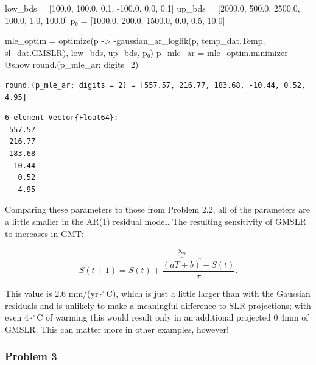 \documentclass[
  letterpaper,
  DIV=11,
  numbers=noendperiod]{scrartcl}
\newenvironment{Shaded}{\begin{snugshade}}{\end{snugshade}}
\newcommand{\FloatTok}[1]{\textcolor[rgb]{0.68,0.00,0.00}{#1}}
\newcommand{\FunctionTok}[1]{\textcolor[rgb]{0.28,0.35,0.67}{#1}}
\newcommand{\NormalTok}[1]{\textcolor[rgb]{0.00,0.23,0.31}{#1}}
\newcommand{\OperatorTok}[1]{\textcolor[rgb]{0.37,0.37,0.37}{#1}}
\newcommand{\PreprocessorTok}[1]{\textcolor[rgb]{0.68,0.00,0.00}{#1}}
\begin{document}
\begin{Shaded}
\begin{Highlighting}[]
\NormalTok{low\_bds }\OperatorTok{=}\NormalTok{ [}\FloatTok{100.0}\NormalTok{, }\FloatTok{100.0}\NormalTok{, }\FloatTok{0.1}\NormalTok{, }\OperatorTok{{-}}\FloatTok{100.0}\NormalTok{, }\FloatTok{0.0}\NormalTok{, }\FloatTok{0.1}\NormalTok{]}
\NormalTok{up\_bds }\OperatorTok{=}\NormalTok{ [}\FloatTok{2000.0}\NormalTok{, }\FloatTok{500.0}\NormalTok{, }\FloatTok{2500.0}\NormalTok{, }\FloatTok{100.0}\NormalTok{, }\FloatTok{1.0}\NormalTok{, }\FloatTok{100.0}\NormalTok{]}
\NormalTok{p₀ }\OperatorTok{=}\NormalTok{ [}\FloatTok{1000.0}\NormalTok{, }\FloatTok{200.0}\NormalTok{, }\FloatTok{1500.0}\NormalTok{, }\FloatTok{0.0}\NormalTok{, }\FloatTok{0.5}\NormalTok{, }\FloatTok{10.0}\NormalTok{]}

\NormalTok{mle\_optim }\OperatorTok{=} \FunctionTok{optimize}\NormalTok{(p }\OperatorTok{{-}\textgreater{}} \FunctionTok{{-}gaussian\_ar\_loglik}\NormalTok{(p, temp\_dat.Temp, sl\_dat.GMSLR), low\_bds, up\_bds, p₀)}
\NormalTok{p\_mle\_ar }\OperatorTok{=}\NormalTok{ mle\_optim.minimizer}
\PreprocessorTok{@show} \FunctionTok{round}\NormalTok{.(p\_mle\_ar; digits}\OperatorTok{=}\FloatTok{2}\NormalTok{)}
\end{Highlighting}
\end{Shaded}

\begin{verbatim}
round.(p_mle_ar; digits = 2) = [557.57, 216.77, 183.68, -10.44, 0.52, 4.95]
\end{verbatim}

\begin{verbatim}
6-element Vector{Float64}:
 557.57
 216.77
 183.68
 -10.44
   0.52
   4.95
\end{verbatim}

Comparing these parameters to those from Problem 2.2, all of the
parameters are a little smaller in the AR(1) residual model. The
resulting sensitivity of GMSLR to increases in GMT:

\[S(t+1) = S(t) + \frac{\overbrace{(aT + b)}^{S_\text{eq}} - S(t)}{\tau}.\]

This value is 2.6 mm/(yr\(\cdot ^\circ\)C), which is just a little
larger than with the Gaussian residuals and is unlikely to make a
meaningful difference to SLR projections; with even 4\(\cdot ^\circ\)C
of warming this would result only in an additional projected 0.4mm of
GMSLR. This can matter more in other examples, however!

\subsubsection{Problem 3}\label{problem-3}
\end{document}
